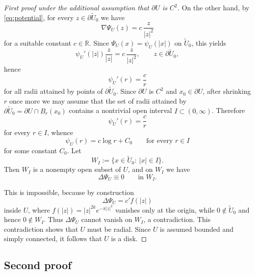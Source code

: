 \documentclass[a4paper,11pt,reqno]{amsart}
\numberwithin{equation}{section}
\theoremstyle{plain} %
\theoremstyle{definition} %
\theoremstyle{remark}
\newcommand{\R}{\mathbb{R}}
\begin{document}
\begin{proof}[First proof under the additional assumption that \(\partial U\) is \(C^2\)]
On the other hand, by \eqref{eq:potential}, for every $z\in \partial \widetilde{U}_0$ we have
\[
\nabla \Psi_U(z)=c\,\frac{z}{|z|^2}
\]
for a suitable constant $c\in \R$. Since $\Psi_U(x)=\psi_U(|x|)$ on $\widetilde{U}_0$, this yields
\[
\psi_U'(|z|)\frac{z}{|z|}=c\,\frac{z}{|z|^2},
\qquad z\in \partial \widetilde{U}_0,
\]
hence
\[
\psi_U'(r)=\frac{c}{r}
\]
for all radii attained by points of $\partial \widetilde{U}_0$. Since
\(\partial U\) is \(C^2\) and \(x_0\in \partial U\), after shrinking \(r\) once
more we may assume that the set of radii attained by
\(\partial \widetilde U_0=\partial U\cap B_r(x_0)\) contains a nontrivial open
interval \(I\subset (0,\infty)\). Therefore
\[
\psi_U'(r)=\frac{c}{r}
\]
for every \(r\in I\), whence
\[
\psi_U(r)=c\log r+C_0
\qquad\text{for every }r\in I
\]
for some constant \(C_0\). Let
\[
W_I:=\{x\in \widetilde U_0:\ |x|\in I\}.
\]
Then \(W_I\) is a nonempty open subset of \(U\), and on \(W_I\) we have
\[
\Delta \Psi_U\equiv 0 \qquad \text{in } W_I.
\]

This is impossible, because by construction
\[
\Delta \Psi_U=c' f(|z|)
\]
inside $U$, where $f(|z|)=|z|^{2k}e^{-\pi |z|^2}$ vanishes only at the origin,
while \(0\notin \widetilde U_0\) and hence \(0\notin W_I\). Thus
\(\Delta\Psi_U\) cannot vanish on \(W_I\), a contradiction. This contradiction
shows that $U$ must be radial. Since $U$ is assumed bounded and simply
connected, it follows that $U$ is a disk.
\end{proof}

\subsection{Second proof}
\end{document}
